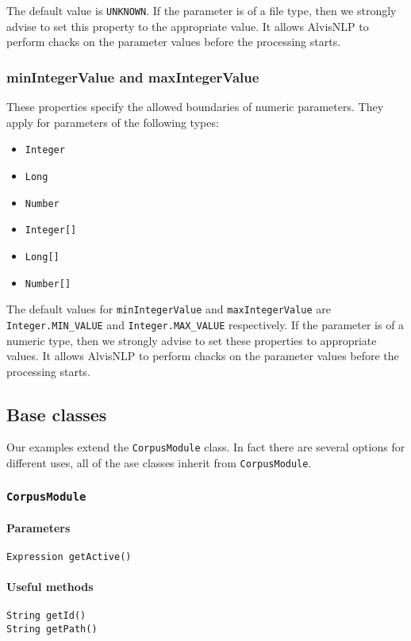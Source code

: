 \documentclass[a4paper]{article}
\begin{document}
The default value is \texttt{UNKNOWN}.
If the parameter is of a file type, then we strongly advise to set this property to the appropriate value.
It allows AlvisNLP to perform chacks on the parameter values before the processing starts.

\subsubsection{minIntegerValue and maxIntegerValue}
These properties specify the allowed boundaries of numeric parameters.
They apply for parameters of the following types:
\begin{itemize}
\item \texttt{Integer}
\item \texttt{Long}
\item \texttt{Number}
\item \texttt{Integer[]}
\item \texttt{Long[]}
\item \texttt{Number[]}
\end{itemize}

The default values for \texttt{minIntegerValue} and \texttt{maxIntegerValue} are \texttt{Integer.MIN\_VALUE} and \texttt{Integer.MAX\_VALUE} respectively.
If the parameter is of a numeric type, then we strongly advise to set these properties to appropriate values.
It allows AlvisNLP to perform chacks on the parameter values before the processing starts.

\subsection{Base classes}
Our examples extend the \texttt{CorpusModule} class.
In fact there are several options for different uses, all of the ase classes inherit from \texttt{CorpusModule}.

\subsubsection{\texttt{CorpusModule}}

\paragraph{Parameters}
\texttt{Expression getActive()}

\paragraph{Useful methods}
\texttt{String getId()}\\
\texttt{String getPath()}\\
\end{document}
